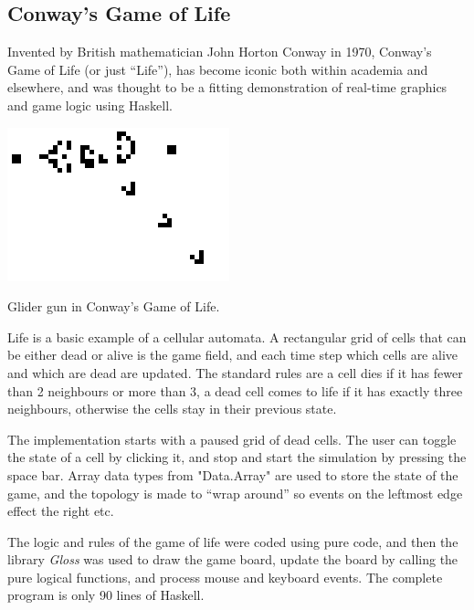 \subsection{Conway's Game of Life}

Invented by British mathematician John Horton Conway in 1970, Conway's Game of Life (or just ``Life''), has become iconic both within academia and elsewhere, and was thought to be a fitting demonstration of real-time graphics and game logic using Haskell. 

\begin{marginfigure}
	\includegraphics{res/conway/conway.png}
	\caption[Glider gun in Conway's Game of Life]{Glider gun in Conway's Game of Life.}
	\label{fig:glidergun}
\end{marginfigure}

Life is a basic example of a cellular automata. A rectangular grid of cells that can be either dead or alive is the game field, and each time step which cells are alive and which are dead are updated. The standard rules are a cell dies if it has fewer than 2 neighbours or more than 3, a dead cell comes to life if it has exactly three neighbours, otherwise the cells stay in their previous state.

The implementation starts with a paused grid of dead cells. The user can toggle the state of a cell by clicking it, and stop and start the simulation by pressing the space bar. Array data types from "Data.Array" are used to store the state of the game, and the topology is made to ``wrap around'' so events on the leftmost edge effect the right etc.

The logic and rules of the game of life were coded using pure code, and then the library \emph{Gloss} was used to draw the game board, update the board by calling the pure logical functions, and process mouse and keyboard events. The complete program is only 90 lines of Haskell.

